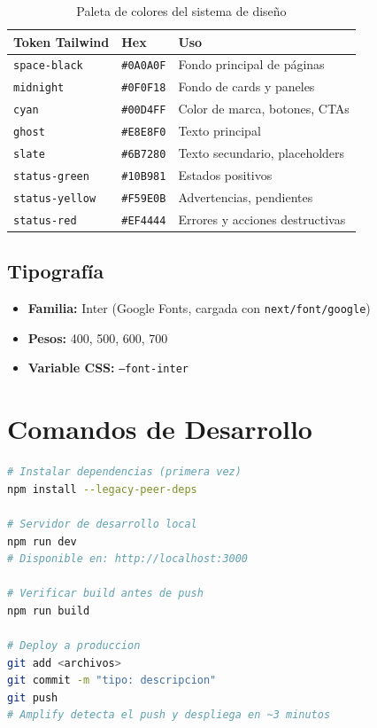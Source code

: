 \documentclass[12pt,a4paper]{article}
\begin{document}
\begin{table}[H]
\centering
\begin{tabular}{@{}lll@{}}
\toprule
\textbf{Token Tailwind} & \textbf{Hex} & \textbf{Uso} \\
\midrule
\texttt{space-black} & \texttt{\#0A0A0F} & Fondo principal de páginas \\
\texttt{midnight} & \texttt{\#0F0F18} & Fondo de cards y paneles \\
\texttt{cyan} & \texttt{\#00D4FF} & Color de marca, botones, CTAs \\
\texttt{ghost} & \texttt{\#E8E8F0} & Texto principal \\
\texttt{slate} & \texttt{\#6B7280} & Texto secundario, placeholders \\
\texttt{status-green} & \texttt{\#10B981} & Estados positivos \\
\texttt{status-yellow} & \texttt{\#F59E0B} & Advertencias, pendientes \\
\texttt{status-red} & \texttt{\#EF4444} & Errores y acciones destructivas \\
\bottomrule
\end{tabular}
\caption{Paleta de colores del sistema de diseño}
\end{table}

\subsection{Tipografía}

\begin{itemize}
  \item \textbf{Familia:} Inter (Google Fonts, cargada con \texttt{next/font/google})
  \item \textbf{Pesos:} 400, 500, 600, 700
  \item \textbf{Variable CSS:} \texttt{--font-inter}
\end{itemize}

\section{Comandos de Desarrollo}

\begin{lstlisting}[language=bash, caption={Comandos frecuentes}]
# Instalar dependencias (primera vez)
npm install --legacy-peer-deps

# Servidor de desarrollo local
npm run dev
# Disponible en: http://localhost:3000

# Verificar build antes de push
npm run build

# Deploy a produccion
git add <archivos>
git commit -m "tipo: descripcion"
git push
# Amplify detecta el push y despliega en ~3 minutos
\end{lstlisting}
\end{document}
